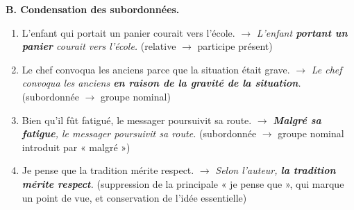 \documentclass[11pt]{article}
\begin{document}
\begin{corrige}
\textbf{B. Condensation des subordonnées.}
\begin{enumerate}
\item[3.] L'enfant qui portait un panier courait vers l'école. $\rightarrow$ \emph{L'enfant \textbf{portant un panier} courait vers l'école.} (relative $\rightarrow$ participe présent)
\item[5.] Le chef convoqua les anciens parce que la situation était grave. $\rightarrow$ \emph{Le chef convoqua les anciens \textbf{en raison de la gravité de la situation}.} (subordonnée $\rightarrow$ groupe nominal)
\item[7.] Bien qu'il fût fatigué, le messager poursuivit sa route. $\rightarrow$ \emph{\textbf{Malgré sa fatigue}, le messager poursuivit sa route.} (subordonnée $\rightarrow$ groupe nominal introduit par « malgré »)
\item[9.] Je pense que la tradition mérite respect. $\rightarrow$ \emph{Selon l'auteur, \textbf{la tradition mérite respect}.} (suppression de la principale « je pense que », qui marque un point de vue, et conservation de l'idée essentielle)
\end{enumerate}
\end{corrige}
\end{document}
